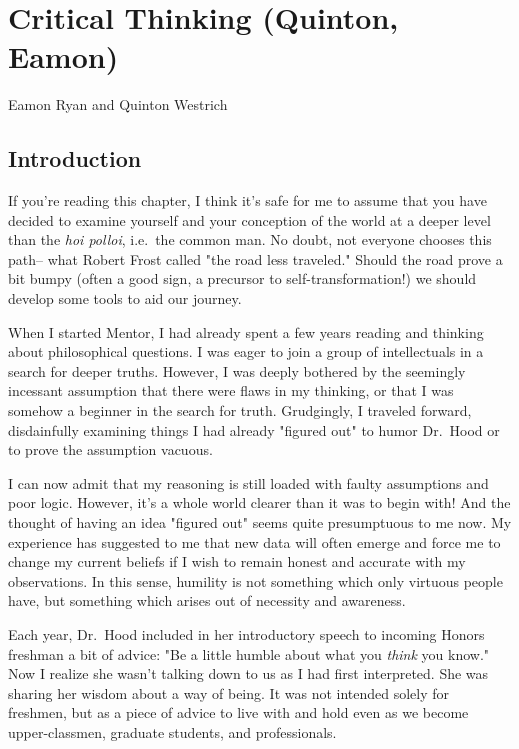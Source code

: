 \chapter{Critical Thinking (Quinton, Eamon)}

\begin{authors}
	Eamon Ryan and Quinton Westrich
\end{authors}

\section{Introduction}

If you're reading this chapter, I think it's safe for me to assume that you have decided to examine yourself and your conception of the world at a deeper level than the \emph{hoi polloi}, i.e.\ the common man. No doubt, not everyone chooses this path-- what Robert Frost called "the road less traveled." Should the road prove a bit bumpy (often a good sign, a precursor to self-transformation!) we should develop some tools to aid our journey. 

When I started Mentor, I had already spent a few years reading and thinking about philosophical questions. I was eager to join a group of intellectuals in a search for deeper truths. However, I was deeply bothered by the seemingly incessant assumption that there were flaws in my thinking, or that I was somehow a beginner in the search for truth. Grudgingly, I traveled forward, disdainfully examining things I had already "figured out" to humor Dr.\ Hood or to prove the assumption vacuous. 

I can now admit that my reasoning is still loaded with faulty assumptions and poor logic. However, it's a whole world clearer than it was to begin with! And the thought of having an idea "figured out" seems quite presumptuous to me now. My experience has suggested to me that new data will often emerge and force me to change my current beliefs if I wish to remain honest and accurate with my observations. In this sense, humility is not something which only virtuous people have, but something which arises out of necessity and awareness.

Each year, Dr.\ Hood included in her introductory speech to incoming Honors freshman a bit of advice: "Be a little humble about what you \emph{think} you know." Now I realize she wasn't talking down to us as I had first interpreted. She was sharing her wisdom about a way of being. It was not intended solely for freshmen, but as a piece of advice to live with and hold even as we become upper-classmen, graduate students, and professionals. 


